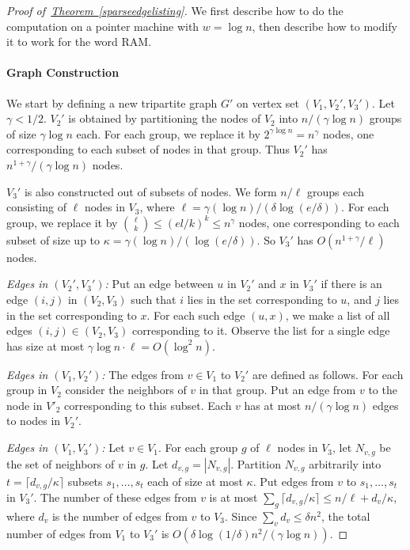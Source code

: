 \documentclass[10pt]{article}
\theoremstyle{definition}
\numberwithin{equation}{section}
\newcommand{\expref}[2]{\texorpdfstring{\hyperref[#2]{#1~\ref{#2}}}{#1~\ref{#2}}}
\begin{document}
\begin{proof}[Proof of~\expref{Theorem}{sparseedgelisting}] We first describe how to do the computation on a pointer machine with $w=\log n$, then describe how to modify it to work for the word RAM.


\paragraph{Graph Construction} We start by defining a new tripartite graph $G'$ on vertex set $(V_1,V_2',V_3')$.
Let $\gamma < 1/2$. $V_2'$ is obtained by partitioning the nodes of $V_2$ into $n/(\gamma \log n)$ groups of size $\gamma \log n$ each. For each group, we replace it by $2^{\gamma \log n} = n^\gamma$ nodes, one corresponding to each subset of nodes in that group. Thus $V_2'$ has $n^{1+\gamma}/(\gamma \log n)$ nodes.

$V_3'$ is also constructed out of subsets of nodes. We form $n/\ell$ groups each consisting of $\ell$ nodes in $V_3$, where $\ell = \gamma (\log n) /(\delta \log(e/\delta))$. For each group, we replace it by $\binom{\ell}{k} \leq (el/k)^k \leq n^\gamma$ nodes, one corresponding to each subset of size up to $\kappa = \gamma (\log n)/(\log (e/\delta))$. So $V_3'$ has $O(n^{1+\gamma}/\ell)$ nodes.

\smallskip
\noindent
\emph{Edges in $(V_2',V_3')$:} Put an edge between $u$ in $V_2'$ and $x$ in $V_3'$ if there is an edge $(i,j)$ in $(V_2,V_3)$ such that $i$ lies in the set corresponding to $u$, and $j$ lies in the set corresponding to $x$. For each such edge $(u,x)$, we make a list of all edges $(i,j) \in (V_2,V_3)$ corresponding to it. Observe the list for a single edge has size at most $ \gamma \log n \cdot \ell = O(\log^2 n)$. 

\smallskip
\noindent
\emph{Edges in $(V_1,V_2')$:} The edges from $v \in V_1$ to $V_2'$ are defined as follows. For each group in $V_2$ consider the neighbors of $v$ in that group. Put an edge from $v$ to the node in $V'_2$ corresponding to this subset. Each $v$ has at most $n/(\gamma \log n)$ edges to nodes in $V_2'$.

\smallskip
\noindent
\emph{Edges in $(V_1,V_3')$:} Let $v \in V_1$. For each group $g$ of $\ell$ nodes in $V_3$, let $N_{v,g}$ be the set of neighbors of $v$ in $g$. Let $d_{v,g} = |N_{v,g}|$. Partition $N_{v,g}$ arbitrarily into $t=\lceil d_{v,g}/\kappa \rceil$ subsets $s_1,\ldots,s_t$ each of size at most $\kappa$. Put edges from $v$ to $s_1,\ldots,s_t$ in $V_3'$. The number of these edges from $v$ is at most $\sum_g \lceil d_{v,g}/\kappa \rceil \leq n/\ell + d_v /\kappa$, where $d_v$ is the number of edges from $v$ to $V_3$. Since $\sum_v d_v \leq \delta n^2$, the total number of edges from $V_1$ to $V_3'$ is $O(\delta \log (1/\delta) n^2 /(\gamma \log n))$.


\end{proof}
\end{document}
